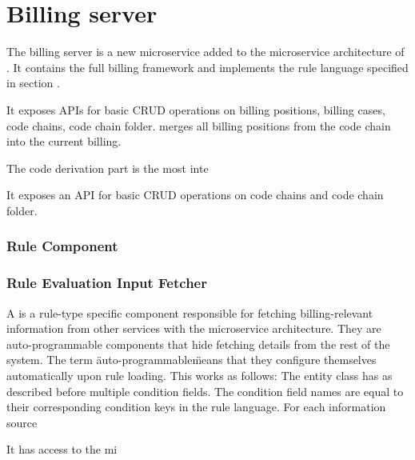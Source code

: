 \section{Billing server}\label{sec:billing-server}
The billing server is a new microservice added to the microservice architecture of \AV.
It contains the full billing framework and implements the rule language specified in section \addref.

It exposes APIs for basic CRUD operations on billing positions, billing cases, code chains, code chain folder.
 merges all billing positions from the code chain into the current billing.









The code derivation part is the most inte



It exposes an API for basic CRUD operations on code chains and code chain folder.

\subsubsection{Rule Component}

\subsubsection{Rule Evaluation Input Fetcher}
A  is a rule-type specific component responsible for fetching billing-relevant information from other services with the \AV microservice architecture.
They are auto-programmable components that hide fetching details from the rest of the system.
The term \"auto-programmable\" means that they configure themselves automatically upon rule loading.
This works as follows: The  entity class has as described before multiple condition fields.
The condition field names are equal to their corresponding condition keys in the rule language.
For each information source 



It has access to the mi
